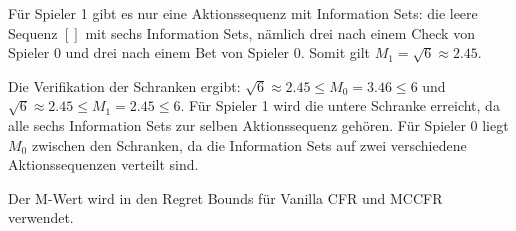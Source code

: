 Für Spieler 1 gibt es nur eine Aktionssequenz mit Information Sets:
die leere Sequenz $[]$ mit sechs Information Sets, nämlich drei nach einem Check von Spieler 0 und drei nach einem Bet von Spieler 0.
Somit gilt $M_1 = \sqrt{6} \approx 2.45$.

Die Verifikation der Schranken ergibt:
$\sqrt{6} \approx 2.45 \le M_0 = 3.46 \le 6$ und $\sqrt{6} \approx 2.45 \le M_1 = 2.45 \le 6$.
Für Spieler 1 wird die untere Schranke erreicht, da alle sechs Information Sets zur selben Aktionssequenz gehören.
Für Spieler 0 liegt $M_0$ zwischen den Schranken, da die Information Sets auf zwei verschiedene Aktionssequenzen verteilt sind.

Der M-Wert wird in den Regret Bounds für Vanilla CFR und MCCFR verwendet.